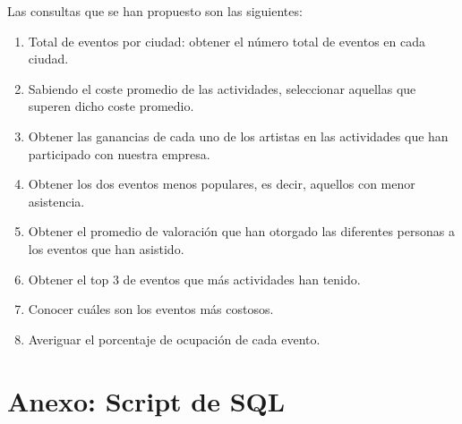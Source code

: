 \documentclass[a4paper,onecolumn]{article}
\let\stdsection\section
\renewcommand\section{\newpage\stdsection}
\begin{document}
\begin{sloppypar}
Las consultas que se han propuesto son las siguientes:
\begin{enumerate}
    \item Total de eventos por ciudad: obtener el número total de eventos en cada ciudad.
    \item Sabiendo el coste promedio de las actividades, seleccionar aquellas que superen dicho coste promedio.
    \item Obtener las ganancias de cada uno de los artistas en las actividades que han participado con nuestra empresa.
    \item Obtener los dos eventos menos populares, es decir, aquellos con menor asistencia.
    \item Obtener el promedio de valoración que han otorgado las diferentes personas a los eventos que han asistido.
    \item Obtener el top 3 de eventos que más actividades han tenido.
    \item Conocer cuáles son los eventos más costosos.
    \item Averiguar el porcentaje de ocupación de cada evento.
\end{enumerate}

\newpage

\appendix
\section{Anexo: Script de SQL}\label{anexo1}
%

\end{sloppypar}
\end{document}
